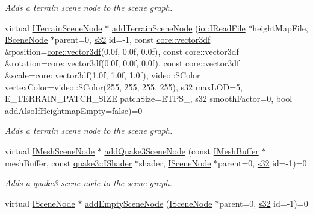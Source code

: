 \begin{DoxyCompactItemize}
\begin{DoxyCompactList}\small\item\em Adds a terrain scene node to the scene graph. \end{DoxyCompactList}\item 
virtual \hyperlink{classirr_1_1scene_1_1ITerrainSceneNode}{I\+Terrain\+Scene\+Node} $\ast$ \hyperlink{classirr_1_1scene_1_1ISceneManager_ae89a0a2d162a86f087eec66ddcd801b6}{add\+Terrain\+Scene\+Node} (\hyperlink{classirr_1_1io_1_1IReadFile}{io\+::\+I\+Read\+File} $\ast$height\+Map\+File, \hyperlink{classirr_1_1scene_1_1ISceneNode}{I\+Scene\+Node} $\ast$parent=0, \hyperlink{namespaceirr_ac66849b7a6ed16e30ebede579f9b47c6}{s32} id=-\/1, const \hyperlink{namespaceirr_1_1core_ae6e2b2a6c552833ebbd5b7463d03586b}{core\+::vector3df} \&position=\hyperlink{namespaceirr_1_1core_ae6e2b2a6c552833ebbd5b7463d03586b}{core\+::vector3df}(0.\+0f, 0.\+0f, 0.\+0f), const core\+::vector3df \&rotation=core\+::vector3df(0.\+0f, 0.\+0f, 0.\+0f), const core\+::vector3df \&scale=core\+::vector3df(1.\+0f, 1.\+0f, 1.\+0f), video\+::\+S\+Color vertex\+Color=video\+::\+S\+Color(255, 255, 255, 255), s32 max\+L\+O\+D=5, E\+\_\+\+T\+E\+R\+R\+A\+I\+N\+\_\+\+P\+A\+T\+C\+H\+\_\+\+S\+I\+Z\+E patch\+Size=\+E\+T\+P\+S\+\_, s32 smooth\+Factor=0, bool add\+Also\+If\+Heightmap\+Empty=false)=0
\begin{DoxyCompactList}\small\item\em Adds a terrain scene node to the scene graph. \end{DoxyCompactList}\item 
virtual \hyperlink{classirr_1_1scene_1_1IMeshSceneNode}{I\+Mesh\+Scene\+Node} $\ast$ \hyperlink{classirr_1_1scene_1_1ISceneManager_a58642d304110532988d27cebbe76ed41}{add\+Quake3\+Scene\+Node} (const \hyperlink{classirr_1_1scene_1_1IMeshBuffer}{I\+Mesh\+Buffer} $\ast$mesh\+Buffer, const \hyperlink{structirr_1_1scene_1_1quake3_1_1IShader}{quake3\+::\+I\+Shader} $\ast$shader, \hyperlink{classirr_1_1scene_1_1ISceneNode}{I\+Scene\+Node} $\ast$parent=0, \hyperlink{namespaceirr_ac66849b7a6ed16e30ebede579f9b47c6}{s32} id=-\/1)=0
\begin{DoxyCompactList}\small\item\em Adds a quake3 scene node to the scene graph. \end{DoxyCompactList}\item 
virtual \hyperlink{classirr_1_1scene_1_1ISceneNode}{I\+Scene\+Node} $\ast$ \hyperlink{classirr_1_1scene_1_1ISceneManager_a3811d3d2a092474e2c5613d550678187}{add\+Empty\+Scene\+Node} (\hyperlink{classirr_1_1scene_1_1ISceneNode}{I\+Scene\+Node} $\ast$parent=0, \hyperlink{namespaceirr_ac66849b7a6ed16e30ebede579f9b47c6}{s32} id=-\/1)=0

\end{DoxyCompactItemize}
